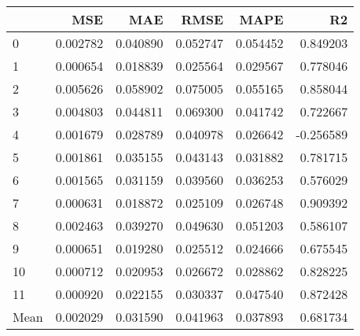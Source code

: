 \begin{tabular}{lrrrrr}
\toprule
 & MSE & MAE & RMSE & MAPE & R2 \\
\midrule
0 & 0.002782 & 0.040890 & 0.052747 & 0.054452 & 0.849203 \\
1 & 0.000654 & 0.018839 & 0.025564 & 0.029567 & 0.778046 \\
2 & 0.005626 & 0.058902 & 0.075005 & 0.055165 & 0.858044 \\
3 & 0.004803 & 0.044811 & 0.069300 & 0.041742 & 0.722667 \\
4 & 0.001679 & 0.028789 & 0.040978 & 0.026642 & -0.256589 \\
5 & 0.001861 & 0.035155 & 0.043143 & 0.031882 & 0.781715 \\
6 & 0.001565 & 0.031159 & 0.039560 & 0.036253 & 0.576029 \\
7 & 0.000631 & 0.018872 & 0.025109 & 0.026748 & 0.909392 \\
8 & 0.002463 & 0.039270 & 0.049630 & 0.051203 & 0.586107 \\
9 & 0.000651 & 0.019280 & 0.025512 & 0.024666 & 0.675545 \\
10 & 0.000712 & 0.020953 & 0.026672 & 0.028862 & 0.828225 \\
11 & 0.000920 & 0.022155 & 0.030337 & 0.047540 & 0.872428 \\
Mean & 0.002029 & 0.031590 & 0.041963 & 0.037893 & 0.681734 \\
\bottomrule
\end{tabular}
